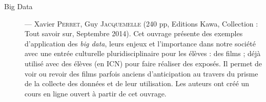 \begin{description}
\item[Big Data] --- 
Xavier \textsc{Perret}, Guy \textsc{Jacquemelle} (240 pp, Editions Kawa, Collection : Tout savoir sur, Septembre 2014). Cet ouvrage présente des exemples d’application des \textit{big data}, leurs enjeux et l'importance dans notre société avec une entrée culturelle pluridisciplinaire pour les élèves : des films ; déjà utilisé avec des élèves (en ICN) pour faire réaliser des exposés. Il permet de voir ou revoir des films parfois anciens d’anticipation au travers du prisme de la collecte des données et de leur utilisation. Les auteurs ont créé un cours en ligne ouvert à partir de cet ouvrage.
\end{description}


\vfill\pagebreak\thispagestyle{empty}





























